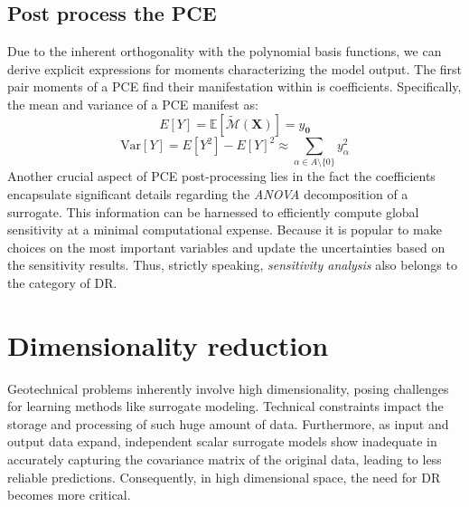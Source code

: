 \subsection{Post process the \acrshort{PCE}}
Due to the inherent orthogonality with the polynomial basis functions, we can derive explicit expressions for moments characterizing the model output. The first pair moments of a \acrshort{PCE} find their manifestation within is coefficients. Specifically, the mean and variance of a \acrshort{PCE} manifest as:
\begin{equation}
E[Y] = \mathbb{E}[\tilde{\mathcal{M}}(\boldsymbol{X})] = y_{\boldsymbol{0}}
\end{equation}
\begin{equation}
\text{Var}[Y] = E[Y^2] - E[Y]^2  \approx \sum_{\alpha \in A \setminus \{0\}} y_{\alpha}^2
\end{equation}
Another crucial aspect of \acrshort{PCE} post-processing lies in the fact the coefficients encapsulate significant details regarding the \textit{ANOVA} decomposition of a surrogate. This information can be harnessed to efficiently compute global sensitivity at a minimal computational expense. Because it is popular to make choices on the most important variables and update the uncertainties based on the sensitivity results. Thus, strictly speaking, \textit{sensitivity analysis} also belongs to the category of \acrshort{DR}. 

\section{Dimensionality reduction}


Geotechnical problems inherently involve high dimensionality, posing challenges for learning methods like surrogate modeling. Technical constraints impact the storage and processing of such huge amount of data. Furthermore, as input and output data expand, independent scalar surrogate models show inadequate in accurately capturing the covariance matrix of the original data, leading to less reliable predictions. Consequently, in high dimensional space, the need for \acrfull{DR} becomes more critical. 

